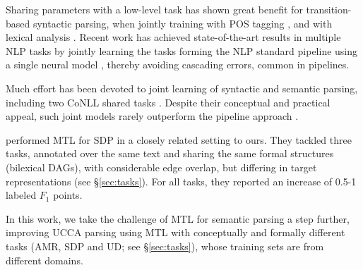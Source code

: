 \documentclass[11pt,a4paper]{article}
\begin{document}
Sharing parameters with a low-level task
has shown great benefit for transition-based syntactic parsing,
when jointly training with POS tagging
\cite{bohnet2012transition,Zhang2016StackpropagationIR}, and
with lexical analysis \cite{constant-nivre:2016:P16-1,more2016joint}.
Recent work has achieved state-of-the-art results in multiple NLP tasks
by jointly learning the tasks forming the NLP standard pipeline using 
a single neural model \cite{collobert2011natural,D17-1206},
thereby avoiding cascading errors, common in pipelines.

Much effort has been devoted to joint learning of syntactic
and semantic parsing, including
two CoNLL shared tasks \cite{surdeanu2008conll,hajivc2009conll}.
Despite their conceptual and practical appeal, such joint models rarely outperform
the pipeline approach %
\cite{lluis2008joint,henderson2013multilingual,D15-1169,swayamdipta-EtAl:2016:CoNLL,swayamdipta2017frame}.

\citet{P17-1186} performed MTL for SDP in a closely related setting to ours.
They tackled three tasks, annotated over the same text
and sharing the same formal structures (bilexical DAGs),
with considerable edge overlap,
but differing in target representations (see \S\ref{sec:tasks}).
For all tasks, they reported an increase of 0.5-1 labeled $F_1$ points.


In this work, we take the challenge of MTL for semantic parsing a step further,
improving UCCA parsing using MTL with conceptually and formally different tasks (AMR, SDP and UD; see \S\ref{sec:tasks}), whose training sets are from different domains.
\end{document}
